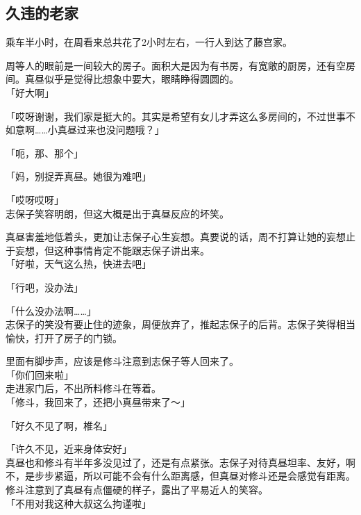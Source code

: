 \subsection{久违的老家}

乘车半小时，在周看来总共花了2小时左右，一行人到达了藤宫家。

周等人的眼前是一间较大的房子。面积大是因为有书房，有宽敞的厨房，还有空房间。真昼似乎是觉得比想象中要大，眼睛睁得圆圆的。\\

「好大啊」

「哎呀谢谢，我们家是挺大的。其实是希望有女儿才弄这么多房间的，不过世事不如意啊……小真昼过来也没问题哦？」

「呃，那、那个」

「妈，别捉弄真昼。她很为难吧」

「哎呀哎呀」\\

志保子笑容明朗，但这大概是出于真昼反应的坏笑。

真昼害羞地低着头，更加让志保子心生妄想。真要说的话，周不打算让她的妄想止于妄想，但这种事情肯定不能跟志保子讲出来。\\

「好啦，天气这么热，快进去吧」

「行吧，没办法」

「什么没办法啊……」\\

志保子的笑没有要止住的迹象，周便放弃了，推起志保子的后背。志保子笑得相当愉快，打开了房子的门锁。

里面有脚步声，应该是修斗注意到志保子等人回来了。\\

「你们回来啦」\\

走进家门后，不出所料修斗在等着。\\

「修斗，我回来了，还把小真昼带来了～」

「好久不见了啊，椎名」

「许久不见，近来身体安好」\\

真昼也和修斗有半年多没见过了，还是有点紧张。志保子对待真昼坦率、友好，啊不，是步步紧逼，所以可能不会有什么距离感，但真昼对修斗还是会感觉有距离。\\

修斗注意到了真昼有点僵硬的样子，露出了平易近人的笑容。\\

「不用对我这种大叔这么拘谨啦」

